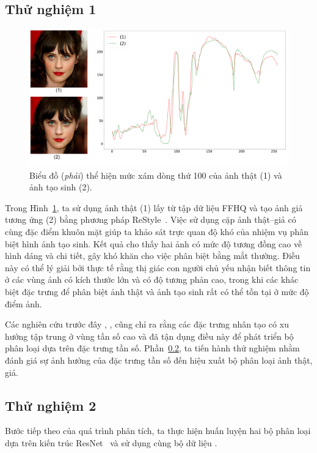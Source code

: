 \subsection{Thử nghiệm 1}
%
\begin{figure}[ht!]
	\centering
	\includegraphics[width=1.0\linewidth]{Images/restyle-encoder-1.png}
	\begin{minipage}{1.0\linewidth}
		\caption{Biểu đồ (\textit{phải}) thể hiện mức xám dòng thứ 100 của ảnh thật (1) và ảnh tạo sinh (2).}
		\label{fig:restyle-encoder-1}
	\end{minipage}
\end{figure}
%
Trong Hình~\ref{fig:restyle-encoder-1}, ta sử dụng ảnh thật (1) lấy từ tập dữ liệu FFHQ và tạo ảnh giả tương ứng (2) bằng phương pháp ReStyle~\cite{alaluf2021restyle}. 
%
Việc sử dụng cặp ảnh thật–giả có cùng đặc điểm khuôn mặt giúp ta khảo sát trực quan độ khó của nhiệm vụ phân biệt hình ảnh tạo sinh. Kết quả cho thấy hai ảnh có mức độ tương đồng cao về hình dáng và chi tiết, gây khó khăn cho việc phân biệt bằng mắt thường.
%
Điều này có thể lý giải bởi thực tế rằng thị giác con người chủ yếu nhận biết thông tin ở các vùng ảnh có kích thước lớn và có độ tương phản cao, trong khi các khác biệt đặc trưng để phân biệt ảnh thật và ảnh tạo sinh rất có thể tồn tại ở mức độ điểm ảnh.
%
%

Các nghiên cứu trước đây \cite{Jeong2021BiHPFBH}, \cite{Frank2020LeveragingFA}, \cite{Jeong2022FrePGANRD} cũng chỉ ra rằng các đặc trưng nhân tạo có xu hướng tập trung ở vùng tần số cao và đã tận dụng điều này để phát triển bộ phân loại dựa trên đặc trưng tần số. Phần~\ref{ssec:thu_nghiem_2}, ta tiến hành thử nghiệm nhằm đánh giá sự ảnh hưởng của đặc trưng tần số đến hiệu xuất bộ phân loại ảnh thật, giả.

\subsection{Thử nghiệm 2}
\label{ssec:thu_nghiem_2}
Bước tiếp theo của quá trình phân tích, ta thực hiện huấn luyện hai bộ phân loại dựa trên kiến trúc ResNet~\cite{He2015DeepRL} và sử dụng cùng bộ dữ liệu \cite{Krizhevsky2012ImageNetCW}.

